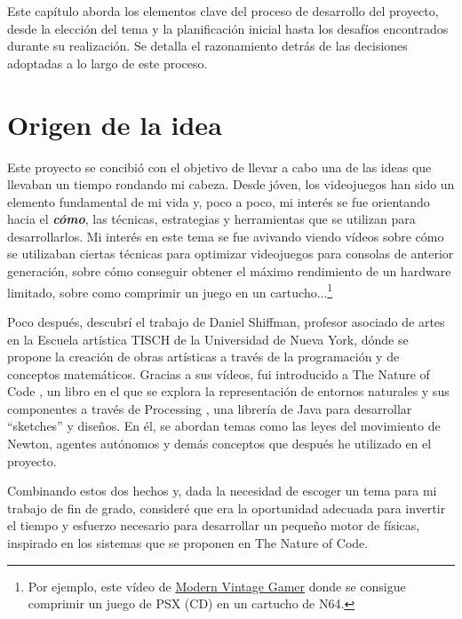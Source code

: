 
Este capítulo aborda los elementos clave del proceso de desarrollo del proyecto, desde la elección del tema y la planificación inicial hasta los desafíos encontrados durante su realización. Se detalla el razonamiento detrás de las decisiones adoptadas a lo largo de este proceso.

\section{Origen de la idea}
Este proyecto se concibió con el objetivo de llevar a cabo una de las ideas que llevaban un tiempo rondando mi cabeza. Desde jóven, los videojuegos han sido un elemento fundamental de mi vida y, poco a poco, mi interés se fue orientando hacia el \textbf{\textit{cómo}}, las técnicas, estrategias y herramientas que se utilizan para desarrollarlos. Mi interés en este tema se fue avivando viendo vídeos sobre cómo se utilizaban ciertas técnicas para optimizar videojuegos para consolas de anterior generación, sobre cómo conseguir obtener el máximo rendimiento de un hardware limitado, sobre como comprimir un juego en un cartucho...\footnote{Por ejemplo, este vídeo de \href{https://www.youtube.com/watch?v=BaX5YUZ5FLk}{Modern Vintage Gamer} donde se consigue comprimir un juego de PSX (CD) en un cartucho de N64.}

Poco después, descubrí el trabajo de Daniel Shiffman, profesor asociado de artes en la Escuela artística TISCH de la Universidad de Nueva York, dónde se propone la creación de obras artísticas a través de la programación y de conceptos matemáticos. Gracias a sus vídeos, fui introducido a The Nature of Code \cite{shiffman12}, un libro en el que se explora la representación de entornos naturales y sus componentes a través de Processing \cite{processing}, una librería de Java para desarrollar ``sketches'' y diseños. En él, se abordan temas como las leyes del movimiento de Newton, agentes autónomos y demás conceptos que después he utilizado en el proyecto. 

Combinando estos dos hechos y, dada la necesidad de escoger un tema para mi trabajo de fin de grado, consideré que era la oportunidad adecuada para invertir el tiempo y esfuerzo necesario para desarrollar un pequeño motor de físicas, inspirado en los sistemas que se proponen en The Nature of Code.


